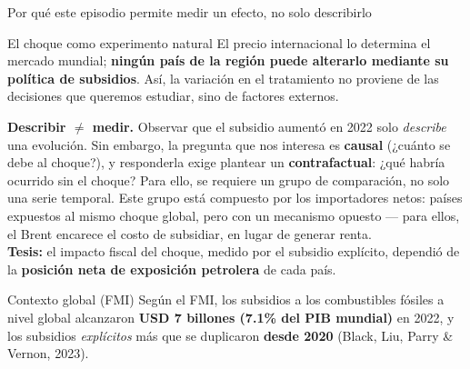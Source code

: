 \documentclass[aspectratio=169,10pt]{beamer}
\newcommand{\key}[1]{{\bfseries\color{AcentoRojo}#1}}
\begin{document}
\begin{frame}{Por qué este episodio permite medir un efecto, no solo describirlo}
  \small
  \begin{block}{El choque como experimento natural}
    El precio internacional lo determina el mercado mundial; \textbf{ningún país de la región
    puede alterarlo mediante su política de subsidios}. Así, la variación en el tratamiento no
    proviene de las decisiones que queremos estudiar, sino de factores externos.
  \end{block}

  \textbf{Describir $\neq$ medir.} Observar que el subsidio aumentó en 2022 solo \emph{describe}
  una evolución. Sin embargo, la pregunta que nos interesa es \textbf{causal} (¿cuánto se debe al
  choque?), y responderla exige plantear un \textbf{contrafactual}: ¿qué habría ocurrido sin el
  choque? Para ello, se requiere un grupo de comparación, no solo una serie temporal. Este grupo
  está compuesto por los \alert{importadores netos}: países expuestos al mismo choque global, pero
  con un mecanismo opuesto — para ellos, el Brent encarece el costo de subsidiar, en lugar de
  generar renta.\\[0.2em]
  \textbf{Tesis:} el impacto fiscal del choque, medido por el subsidio explícito,
  dependió de la \key{posición neta de exposición petrolera} de cada país.
  \vspace{-0.5em}

  \begin{block}{Contexto global (FMI)}
    {\footnotesize Según el FMI, los subsidios a los combustibles fósiles a nivel global alcanzaron \textbf{USD 7 billones
    (7.1\% del PIB mundial)} en 2022, y los subsidios \emph{explícitos} más que se duplicaron
    \textbf{desde 2020} (Black, Liu, Parry \& Vernon, 2023).}
  \end{block}

\end{frame}
\end{document}
